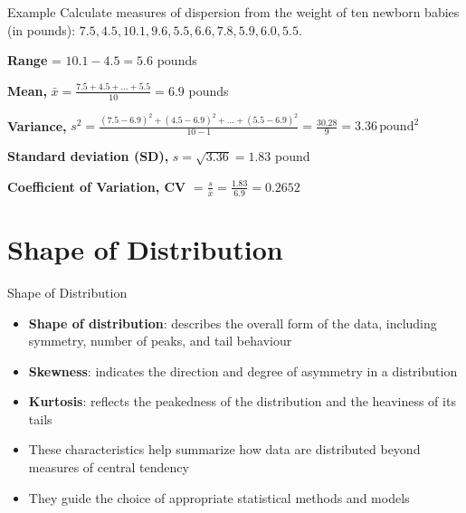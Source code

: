 \documentclass[12pt, aspectratio=169]{beamer}
\begin{document}
    \begin{frame}{Example}
        Calculate measures of dispersion from the weight of ten newborn babies (in pounds): $7.5, 4.5, 10.1, 9.6, 5.5, 6.6, 7.8, 5.9, 6.0, 5.5$.
        \vspace{0.5em}

        \textbf{Range} = $10.1 - 4.5 = 5.6$ pounds
        \vspace{0.5em}

        \textbf{Mean,} $\bar{x} = \frac{7.5 + 4.5 +...+ 5.5}{10} = 6.9$ pounds
        \vspace{0.5em}

        \textbf{Variance,} $s^2 = \frac{(7.5-6.9)^2 + (4.5-6.9)^2 + ... + (5.5-6.9)^2}{10-1}=\frac{30.28}{9}=3.36 \, \text{pound}^2$
        \vspace{0.5em}

        \textbf{Standard deviation (SD),} $s = \sqrt{3.36} = 1.83$ pound
        \vspace{0.5em}

        \textbf{Coefficient of Variation, CV} $= \frac{s}{\bar{x}} = \frac{1.83}{6.9} = 0.2652$
    \end{frame}


    \section{Shape of Distribution}

    \begin{frame}{Shape of Distribution}
        \begin{itemize}
            \item \textbf{Shape of distribution}: describes the overall form of the data, including symmetry, number of peaks, and tail behaviour
            \item \textbf{Skewness}: indicates the direction and degree of asymmetry in a distribution
            \item \textbf{Kurtosis}: reflects the peakedness of the distribution and the heaviness of its tails
            \item These characteristics help summarize how data are distributed beyond measures of central tendency
            \item They guide the choice of appropriate statistical methods and models
        \end{itemize}
    \end{frame}
\end{document}
